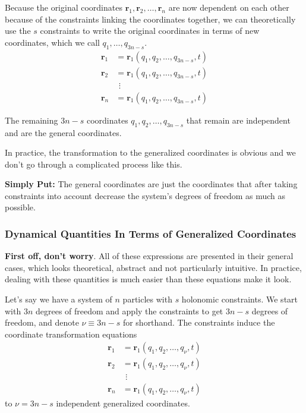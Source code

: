 \documentclass[11pt, a4paper]{article}
\begin{document}
Because the original coordinates $ \bm{r}_1, \bm{r}_{2}, \dots, \bm{r}_{n}  $ are now dependent on each other because of the constraints linking the coordinates together, we can theoretically use the $ s $ constraints to write the original coordinates in terms of new coordinates, which we call $ q_1, \dots, q_{3n-s} $. 
\begin{align*}
	\bm{r}_1 &= \bm{r}_1(q_1, q_2, \dots, q_{3n-s}, t)\\
	\bm{r}_2 &= \bm{r}_1(q_1, q_2, \dots, q_{3n-s}, t)\\
	&\ \, \vdots\\
	\bm{r}_n &= \bm{r}_1(q_1, q_2, \dots, q_{3n-s}, t)
\end{align*}

The remaining $ 3n-s $ coordinates $ q_1, q_2, \dots, q_{3n-s} $ that remain are independent and are the general coordinates.

In practice, the transformation to the generalized coordinates is obvious and we don't go through a complicated process like this.

\textbf{Simply Put:} The general coordinates are just the coordinates that after taking constraints into account decrease the system's degrees of freedom as much as possible.


\subsubsection{Dynamical Quantities In Terms of Generalized Coordinates}
\textbf{First off, don't worry}. All of these expressions are presented in their general cases, which looks theoretical, abstract and not particularly intuitive. In practice, dealing with these quantities is much easier than these equations make it look.

Let's say we have a system of $ n $ particles with $ s $ holonomic constraints. We start with $ 3n $ degrees of freedom and apply the constraints to get $ 3n - s $ degrees of freedom, and denote $ \nu \equiv 3n -s $ for shorthand. The constraints induce the coordinate transformation equations
\begin{align*}
	\bm{r}_1 &= \bm{r}_1(q_1, q_2, \dots, q_{\nu}, t)\\
	\bm{r}_2 &= \bm{r}_1(q_1, q_2, \dots, q_{\nu}, t)\\
	&\ \, \vdots\\
	\bm{r}_n &= \bm{r}_1(q_1, q_2, \dots, q_{\nu}, t)
\end{align*}
to $ \nu = 3n - s $ independent generalized coordinates.
\end{document}
